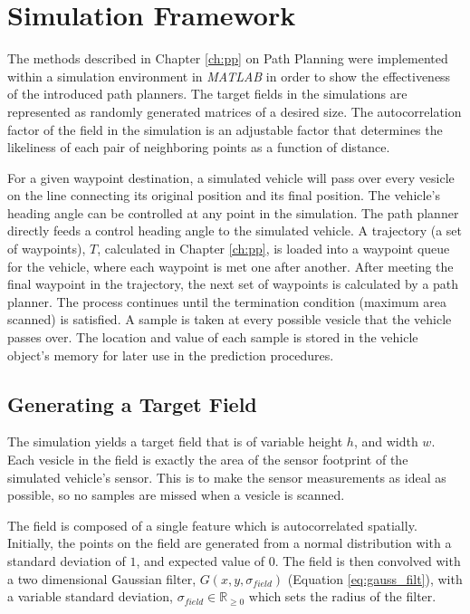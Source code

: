 \chapter{Simulation Framework}
The methods described in Chapter \ref{ch:pp} on Path Planning were implemented within a simulation environment in \textit{MATLAB} in order to show the effectiveness of the introduced path planners. The target fields in the simulations are represented as randomly generated matrices of a desired size. The autocorrelation factor of the field in the simulation is an adjustable factor that determines the likeliness of each pair of neighboring points as a function of distance. 

For a given waypoint destination, a simulated vehicle will pass over every vesicle on the line connecting its original position and its final position. The vehicle's heading angle can be controlled at any point in the simulation. The path planner directly feeds a control heading angle to the simulated vehicle. A trajectory (a set of waypoints), $T$, calculated in Chapter \ref{ch:pp}, is loaded into a waypoint queue for the vehicle, where each waypoint is met one after another. After meeting the final waypoint in the trajectory, the next set of waypoints is calculated by a path planner. The process continues until the termination condition (maximum area scanned) is satisfied. A sample is taken at every possible vesicle that the vehicle passes over. The location and value of each sample is stored in the vehicle object's memory for later use in the prediction procedures.

\section{Generating a Target Field}
The simulation yields a target field that is of variable height $h$, and width $w$. Each vesicle in the field is exactly the area of the sensor footprint of the simulated vehicle's sensor. This is to make the sensor measurements as ideal as possible, so no samples are missed when a vesicle is scanned.

The field is composed of a single feature which is autocorrelated spatially. Initially, the points on the field are generated from a normal distribution with a standard deviation of $1$, and expected value of $0$. The field is then convolved with a two dimensional Gaussian filter, $G(x,y,\sigma_{field})$ (Equation \ref{eq:gauss_filt}), with a variable standard deviation, $\sigma_{field} \in \mathbb{R}_{\geq 0}$ which sets the radius of the filter. 

